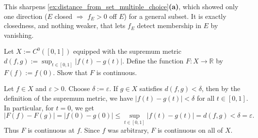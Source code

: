 \begin{remark}
This sharpens \cref{ex:distance_from_set_multiple_choice}\textbf{(a)}, which showed only one direction ($E$ closed
$\Rightarrow$ $f_E > 0$ off $E$) for a general subset. It is exactly closedness, and nothing
weaker, that lets $f_E$ detect membership in $E$ by vanishing.
\end{remark}

\begin{exercise}
\label{ex:evaluation_map_continuous}
Let $X := C^0([0,1])$ equipped with the supremum metric $d(f,g) := \sup_{t \in [0,1]} |f(t) - g(t)|$. Define the function $F : X \to \mathbb{R}$ by $F(f) := f(0)$. Show that $F$ is continuous.
\end{exercise}

\begin{exercisesolution}
Let $f \in X$ and $\varepsilon > 0$. Choose $\delta := \varepsilon$. If $g \in X$ satisfies $d(f, g) < \delta$, then by the definition of the supremum metric, we have $|f(t) - g(t)| < \delta$ for all $t \in [0,1]$.
In particular, for $t = 0$, we get
\[|F(f) - F(g)| = |f(0) - g(0)| \leq \sup_{t \in [0,1]} |f(t) - g(t)| = d(f, g) < \delta = \varepsilon.\]
Thus $F$ is continuous at $f$. Since $f$ was arbitrary, $F$ is continuous on all of $X$.
\end{exercisesolution}

